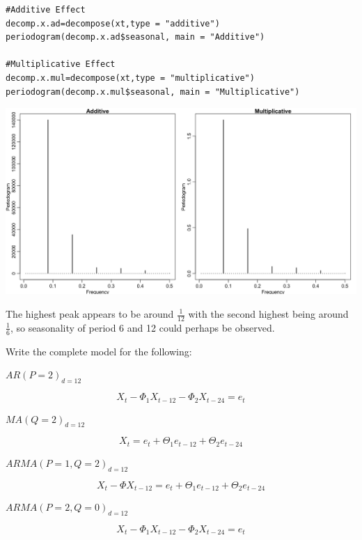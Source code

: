 \documentclass[10pt,a4paper]{exam}
\begin{document}
\begin{questions}
\begin{solution}
\begin{verbatim}
#Additive Effect
decomp.x.ad=decompose(xt,type = "additive")
periodogram(decomp.x.ad$seasonal, main = "Additive")

#Multiplicative Effect
decomp.x.mul=decompose(xt,type = "multiplicative")
periodogram(decomp.x.mul$seasonal, main = "Multiplicative")
\end{verbatim}

\includegraphics[width=.9\linewidth]{AirPassengerSeasonality}


The highest peak appears to be around $\frac{1}{12}$ with the second highest being around $\frac{1}{6}$, so seasonality of period 6 and 12 could perhaps be observed.
\end{solution}





\pagebreak

\question Write the complete model for the following:
\begin{parts}
\item $AR(P = 2)_{d=12}$
\begin{solution}
$$X_t - \Phi_1 X_{t-12} - \Phi_2 X_{t-24} = e_t$$
\end{solution}

\item $MA(Q = 2)_{d=12}$
\begin{solution}
$$X_t = e_t + \Theta_1 e_{t-12} + \Theta_2 e_{t-24}$$
\end{solution}

\item $ARMA(P = 1, Q = 2)_{d=12}$
\begin{solution}
$$X_t - \Phi X_{t-12} = e_t + \Theta_1 e_{t-12} + \Theta_2 e_{t-24}$$
\end{solution}

\item $ARMA(P = 2, Q = 0)_{d=12}$
\begin{solution}
$$X_t - \Phi_1 X_{t-12} - \Phi_2 X_{t-24} = e_t$$
\end{solution}


\end{parts}
\end{questions}
\end{document}
